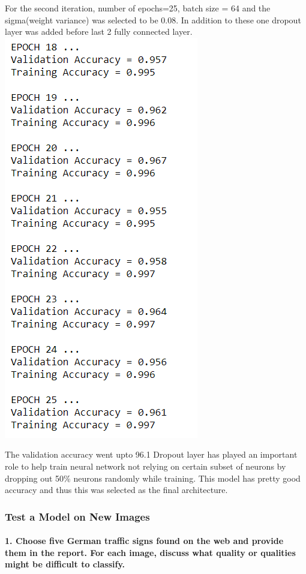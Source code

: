 \documentclass[11pt]{article}
\makeatletter
\def\maxwidth{\ifdim\Gin@nat@width>\linewidth\linewidth
    \else\Gin@nat@width\fi}
\let\Oldincludegraphics\includegraphics
\renewcommand{\includegraphics}[1]{\Oldincludegraphics[width=.8\maxwidth]{#1}}
\makeatother
\begin{document}
For the second iteration, number of epochs=25, batch size = 64 and the
sigma(weight variance) was selected to be 0.08. In addition to these one
dropout layer was added before last 2 fully connected layer.
\includegraphics{iteration3.PNG}

The validation accuracy went upto 96.1 Dropout layer has played an
important role to help train neural network not relying on certain
subset of neurons by dropping out 50\% neurons randomly while training.
This model has pretty good accuracy and thus this was selected as the
final architecture.

\hypertarget{test-a-model-on-new-images}{%
\subsubsection{Test a Model on New
Images}\label{test-a-model-on-new-images}}

\hypertarget{choose-five-german-traffic-signs-found-on-the-web-and-provide-them-in-the-report.-for-each-image-discuss-what-quality-or-qualities-might-be-difficult-to-classify.}{%
\paragraph{1. Choose five German traffic signs found on the web and
provide them in the report. For each image, discuss what quality or
qualities might be difficult to
classify.}\label{choose-five-german-traffic-signs-found-on-the-web-and-provide-them-in-the-report.-for-each-image-discuss-what-quality-or-qualities-might-be-difficult-to-classify.}}
\end{document}
